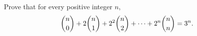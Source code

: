 Prove that for every positive integer $n$,
\[\dbinom n0+2\dbinom n1+2^2\dbinom n2+\cdots+2^n\dbinom nn=3^n.\]
